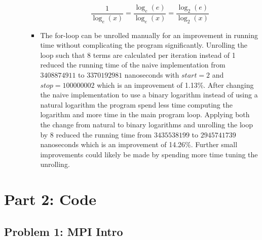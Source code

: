 \begin{enumerate}
\begin{enumerate}
\begin{itemize}
\begin{displaymath}
\frac{1}{\log_{e}(x)} = \frac{\log_{e}(e)}{\log_{e}(x)} = \frac{\log_{2}(e)}{\log_{2}(x)}
\end{displaymath}

\item The for-loop can be unrolled manually for an improvement in running time without complicating the program significantly. Unrolling the loop such that 8 terms are calculated per iteration instead of 1 reduced the running time of the naive implementation from $3408874911$ to $3370192981$ nanoseconds with $start=2$ and $stop=100000002$ which is an improvement of 1.13\%. After changing the naive implementation to use a binary logarithm instead of using a natural logarithm the program spend less time computing the logarithm and more time in the main program loop. Applying both the change from natural to binary logarithms and unrolling the loop by 8 reduced the running time from $3435538199$ to $2945741739$ nanoseconds which is an improvement of 14.26\%. Further small improvements could likely be made by spending more time tuning the unrolling.

\end{itemize}

\end{enumerate}

\end{enumerate}

\section*{Part 2: Code}

\subsection*{Problem 1: MPI Intro}

